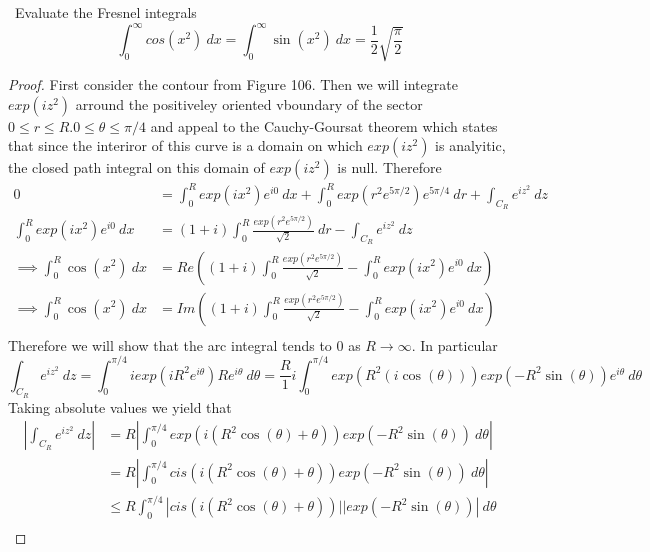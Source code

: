 \documentclass[11pt]{amsart}
\theoremstyle{definition}
\numberwithin{theorem}{section}
\numberwithin{definition}{section}
\numberwithin{equation}{section}
\newcommand{\parens}[1]{ \left( #1 \right) }
\begin{document}
\medskip {}\ Evaluate the Fresnel integrals
\begin{equation*}
	\int_0^\infty cos(x^2)\ dx = \int_0^\infty \sin(x^2)\ dx = \frac{1}{2} \sqrt{\frac{\pi}{2}}
\end{equation*}
\begin{proof}
	First consider the contour from Figure 106. Then we will integrate $exp(iz^2)$ arround the positiveley oriented vboundary of the sector $0 \leq r \leq R. 0 \leq \theta \leq \pi/4$ and appeal to the Cauchy-Goursat theorem which states that since the interiror of this curve is a domain on which $exp(iz^2)$ is analyitic, the closed path integral on this domain of $exp(iz^2)$ is null. Therefore
	\begin{equation*}
		\begin{aligned}
			0 &= \int_0^R exp(ix^2)e^{i0}\ dx + \int_0^R exp\parens{r^2e^{5\pi/2}}e^{5\pi/4}\ dr + \int_{C_R} e^{iz^2}\ dz \\
			\int_0^R exp(ix^2)e^{i0}\ dx &= (1 + i)\int_0^R \frac{exp\parens{r^2e^{5\pi/2}}}{\sqrt{2}}\ dr - \int_{C_R} e^{iz^2}\ dz \\
			\implies \int_0^R \cos(x^2)\ dx &= Re\parens{(1 + i)\int_0^R \frac{exp\parens{r^2e^{5\pi/2}}}{\sqrt{2}} - \int_0^R exp(ix^2)e^{i0}\ dx} \\
			\implies \int_0^R \cos(x^2)\ dx &= Im\parens{(1 + i)\int_0^R \frac{exp\parens{r^2e^{5\pi/2}}}{\sqrt{2}}- \int_0^R exp(ix^2)e^{i0}\ dx} \\
		\end{aligned}
	\end{equation*}
	Therefore we will show that the arc integral tends to $0$ as $R \to \infty$. In particular
	\begin{equation*}
		\int_{C_R} e^{iz^2}\ dz = \int_0^{\pi/4} iexp\parens{iR^2e^{i\theta}}Re^{i\theta}\ d\theta = \frac{R}{1}i\int_0^{\pi/4} exp\parens{R^2(i\cos(\theta))}exp( -R^2 \sin(\theta))e^{i\theta}\ d\theta
	\end{equation*}
	Taking absolute values we yield that
	\begin{equation*}
	\begin{aligned}
		\left|\int_{C_R} e^{iz^2}\ dz \right| &= R\left| \int_0^{\pi/4} exp\parens{i(R^2\cos(\theta) + \theta)}exp( -R^2 \sin(\theta))\ d\theta \right| \\
		&=R\left| \int_0^{\pi/4} cis\parens{i(R^2\cos(\theta) + \theta)}exp( -R^2 \sin(\theta))\ d\theta \right| \\
		&\leq R \int_0^{\pi/4} \left|cis\parens{i(R^2\cos(\theta) + \theta)}||exp( -R^2 \sin(\theta))\right|\ d\theta \\

\end{aligned}
\end{equation*}
\end{proof}
\end{document}
